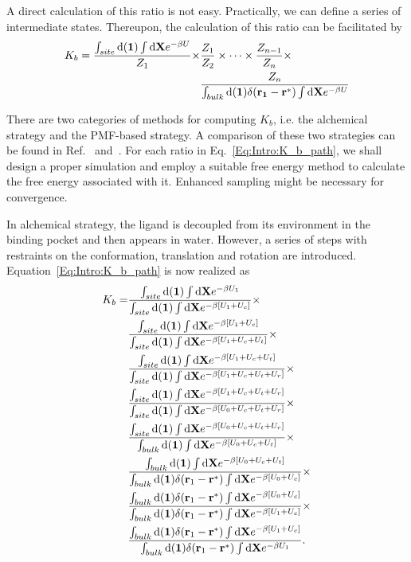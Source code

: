 A direct calculation of this ratio is not easy. Practically, we can define a series of intermediate states. Thereupon, the calculation of this ratio can be facilitated by
\begin{align}
K_b=\frac{\int_{site}\mathop{}\!\mathrm{d}(\mathbf{1})\int \mathop{}\!\mathrm{d}\mathbf{X}e^{-\beta U}}{Z_1}\times&\frac{Z_1}{Z_2}\times\cdots\times\frac{Z_{n-1}}{Z_n}\times\notag\\ &\frac{Z_n}{\int_{bulk}\mathop{}\!\mathrm{d}(\mathbf{1})\delta(\mathbf{r_1}-\mathbf{r}^*)\int \mathop{}\!\mathrm{d}\mathbf{X}e^{-\beta U}}
\label{Eq:Intro:K_b_path}
\end{align}

There are two categories of methods for computing $K_b$, i.e. the alchemical strategy\cite{DengJCTC2006} and the PMF-based strategy\cite{WooPNAS2005}. A comparison of these two strategies can be found in Ref.~\cite{DengJPCB2009} and~\cite{GumbartJCTC2013}. For each ratio in Eq.~\ref{Eq:Intro:K_b_path}, we shall design a proper simulation and employ a suitable free energy method to calculate the free energy associated with it. Enhanced sampling might be necessary for convergence.

In alchemical strategy, the ligand is decoupled from its environment in the binding pocket and then appears in water. However, a series of steps with restraints on the conformation, translation and rotation are introduced. Equation~\ref{Eq:Intro:K_b_path} is now realized as
\begin{align}
  K_b=&\frac{\int_{site}\diff(\mathbf{1})\int \diff\mathbf{X}e^{-\beta U_1}}{\int_{site}\diff(\mathbf{1})\int \diff\mathbf{X}e^{-\beta [U_1+U_c]}}\times\notag\\
      &\frac{\int_{site}\diff(\mathbf{1})\int \diff\mathbf{X}e^{-\beta [U_1+U_c]}}{\int_{site}\diff(\mathbf{1})\int \diff\mathbf{X}e^{-\beta [U_1+U_c+U_t]}}\times\notag\\
      &\frac{\int_{site}\diff(\mathbf{1})\int \diff\mathbf{X}e^{-\beta [U_1+U_c+U_t]}}{\int_{site}\diff(\mathbf{1})\int \diff\mathbf{X}e^{-\beta [U_1+U_c+U_t+U_r]}}\times\notag\\
      &\frac{\int_{site}\diff(\mathbf{1})\int \diff\mathbf{X}e^{-\beta [U_1+U_c+U_t+U_r]}}{\int_{site}\diff(\mathbf{1})\int \diff\mathbf{X}e^{-\beta [U_0+U_c+U_t+U_r]}}\times\notag\\
      &\frac{\int_{site}\diff(\mathbf{1})\int \diff\mathbf{X}e^{-\beta [U_0+U_c+U_t+U_r]}}{\int_{bulk}\diff(\mathbf{1})\int \diff\mathbf{X}e^{-\beta [U_0+U_c+U_t]}}\times\notag\\
      &\frac{\int_{bulk}\diff(\mathbf{1})\int \diff\mathbf{X}e^{-\beta [U_0+U_c+U_t]}}{\int_{bulk}\diff(\mathbf{1})\delta(\mathbf{r}_1-\mathbf{r}^*)\int \diff\mathbf{X}e^{-\beta [U_0+U_c]}}\times\notag\\
      &\frac{\int_{bulk}\diff(\mathbf{1})\delta(\mathbf{r}_1-\mathbf{r}^*)\int \diff\mathbf{X}e^{-\beta [U_0+U_c]}}{\int_{bulk}\diff(\mathbf{1})\delta(\mathbf{r}_1-\mathbf{r}^*)\int \diff\mathbf{X}e^{-\beta [U_1+U_c]}}\times\notag\\
      &\frac{\int_{bulk}\diff(\mathbf{1})\delta(\mathbf{r}_1-\mathbf{r}^*)\int \diff\mathbf{X}e^{-\beta [U_1+U_c]}}{\int_{bulk}\diff(\mathbf{1})\delta(\mathbf{r}_1-\mathbf{r}^*)\int \diff\mathbf{X}e^{-\beta U_1}}.
\end{align}

